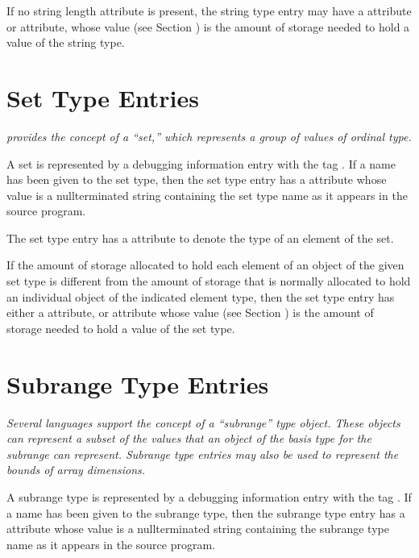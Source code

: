 If no string length attribute is present, the string type
entry may have a  attribute or 
attribute, whose value 
(see Section ) 
is the amount of
storage needed to hold a value of the string type.


\section{Set Type Entries}
\label{chap:settypeentries}

\textit{ provides the concept of a “set,” which represents
a group of values of ordinal type.}

A set is represented by a debugging information entry with
the tag . 
If a name has been given to the
set type, then the set type entry has 
a  attribute
whose value is a null\dash terminated string containing the
set type name as it appears in the source program.

The set type entry has 
a  attribute to denote the
type of an element of the set.

If the amount of storage allocated to hold each element of an
object of the given set type is different from the amount of
storage that is normally allocated to hold an individual object
of the indicated element type, then the set type entry has
either a  attribute, or 
 attribute
whose value (see Section ) is
the amount of storage needed to hold a value of the set type.


\section{Subrange Type Entries}
\label{chap:subrangetypeentries}

\textit{Several languages support the concept of a ``subrange''
type object. These objects can represent a subset of the
values that an object of the basis type for the subrange can
represent. 
Subrange type entries may also be used to represent
the bounds of array dimensions.}

A subrange type is represented by a debugging information
entry with the 
tag . 
If a name has been
given to the subrange type, then the subrange type entry
has a  attribute
whose value is a null\dash terminated
string containing the subrange type name as it appears in
the source program.

